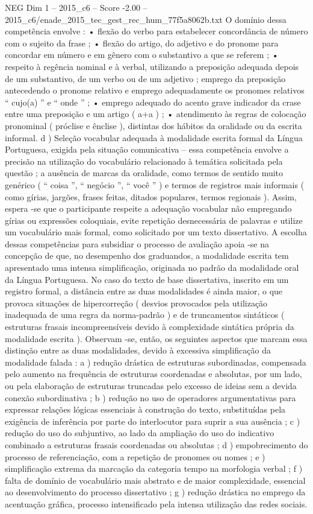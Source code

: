 \begin{textsample}{NEG Dim 1 – 2015\_c6 – Score -2.00 – 2015\_c6/enade\_2015\_tec\_gest\_rec\_hum\_77f5a8062b.txt}
O domínio dessa competência envolve : • flexão do verbo para estabelecer concordância de número com o sujeito da frase ; • flexão do artigo, do adjetivo e do pronome para concordar em número e em gênero com o substantivo a que se referem ; • respeito à regência nominal e à verbal, utilizando a preposição adequada depois de um substantivo, de um verbo ou de um adjetivo ; emprego da preposição antecedendo o pronome relativo e emprego adequadamente os pronomes relativos “ cujo(a) ” e “ onde ” ; • emprego adequado do acento grave indicador da crase entre uma preposição e um artigo ( a+a ) ; • atendimento às regras de colocação pronominal ( próclise e ênclise ), distintas dos hábitos da oralidade ou da escrita informal. d ) Seleção vocabular adequada à modalidade escrita formal da Língua Portuguesa, exigida pela situação comunicativa – essa competência envolve a precisão na utilização do vocabulário relacionado à temática solicitada pela questão ; a ausência de marcas da oralidade, como termos de sentido muito genérico ( “ coisa ”, “ negócio ”, “ você ” ) e termos de registros mais informais ( como gírias, jargões, frases feitas, ditados populares, termos regionais ).
Assim, espera -se que o participante respeite a adequação vocabular não empregando gírias ou expressões coloquiais, evite repetição desnecessária de palavras e utilize um vocabulário mais formal, como solicitado por um texto dissertativo.
A escolha dessas competências para subsidiar o processo de avaliação apoia -se na concepção de que, no desempenho dos graduandos, a modalidade escrita tem apresentado uma intensa simplificação, originada no padrão da modalidade oral da Língua Portuguesa.
No caso do texto de base dissertativa, inscrito em um registro formal, a distância entre as duas modalidades é ainda maior, o que provoca situações de hipercorreção ( desvios provocados pela utilização inadequada de uma regra da norma-padrão ) e de truncamentos sintáticos ( estruturas frasais incompreensíveis devido à complexidade sintática própria da modalidade escrita ).
Observam -se, então, os seguintes aspectos que marcam essa distinção entre as duas modalidades, devido à excessiva simplificação da modalidade falada : a ) redução drástica de estruturas subordinadas, compensada pelo aumento na frequência de estruturas coordenadas e absolutas, por um lado, ou pela elaboração de estruturas truncadas pelo excesso de ideias sem a devida conexão subordinativa ; b ) redução no uso de operadores argumentativas para expressar relações lógicas essenciais à construção do texto, substituídas pela exigência de inferência por parte do interlocutor para suprir a sua ausência ; c ) redução do uso do subjuntivo, ao lado da ampliação do uso do indicativo combinado a estruturas frasais coordenadas ou absolutas ; d ) empobrecimento do processo de referenciação, com a repetição de pronomes ou nomes ; e ) simplificação extrema da marcação da categoria tempo na morfologia verbal ; f ) falta de domínio de vocabulário mais abstrato e de maior complexidade, essencial ao desenvolvimento do processo dissertativo ; g ) redução drástica no emprego da acentuação gráfica, processo intensificado pela intensa utilização das redes sociais.

\end{textsample}
